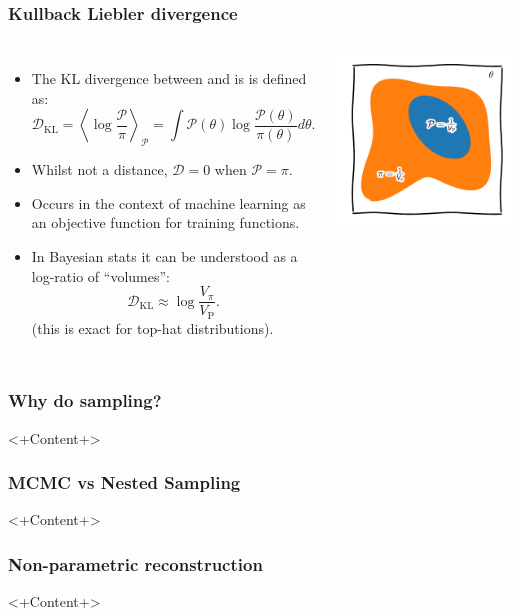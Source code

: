 \documentclass[aspectratio=169]{beamer}
\newcommand{\av}[2][1]{\left\langle #2\right\rangle_{#1}}
\begin{document}
\begin{frame}
    \frametitle{Kullback Liebler divergence}
    \begin{columns}
        \begin{itemize}
            \item The KL divergence between  and  is is defined as:
                \[\mathcal{D}_\mathrm{KL} = \av[\mathcal{P}]{\log\frac{\mathcal{P}}{\pi}} = \int \mathcal{P}(\theta) \log \frac{\mathcal{P}(\theta)}{\pi(\theta)}d\theta.\]
            \item Whilst not a distance, $\mathcal{D}=0$ when $\mathcal{P}=\pi$.
            \item Occurs in the context of machine learning as an objective function for training functions.
            \item In Bayesian stats it can be understood as a log-ratio of ``volumes'':
                \[ \mathcal{D}_\mathrm{KL} \approx \log \frac{V_\pi}{V_\mathrm{P}}.\]
                (this is exact for top-hat distributions).
        \end{itemize}
        \includegraphics{figures/volumes.pdf}
    \end{columns}
\end{frame}

\begin{frame}
    \frametitle{Why do sampling?}
    <+Content+>
\end{frame}

\begin{frame}
    \frametitle{MCMC vs Nested Sampling}
    <+Content+>
\end{frame}

\begin{frame}
    \frametitle{Non-parametric reconstruction}
    <+Content+>
\end{frame}
\end{document}
